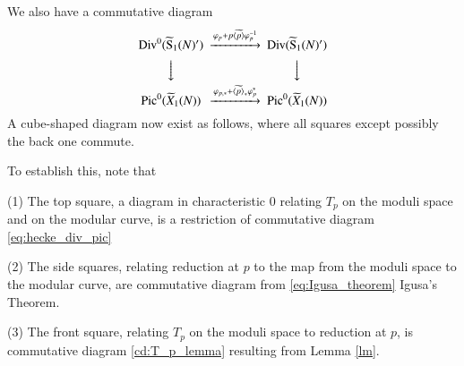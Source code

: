 We also have a commutative diagram 
\begin{equation}
    \begin{CD}
        {\rm Div}^0(\widetilde{{\rm S}}_1(N)') @>\varphi_p+p\widetilde{\left\langle p \right\rangle }\varphi_p^{-1}>> {\rm Div}(\widetilde{{\rm S}}_1(N)') \\
        @VVV @VVV \\
        {\rm Pic}^0(\widetilde{X}_1(N)) @>\varphi_{p,*}+\widetilde{\left\langle p \right\rangle }_*\varphi_p^*>> {\rm Pic}^0(\widetilde{X}_1(N))
    \end{CD}
    \label{cd:lemma}
\end{equation}
A cube-shaped diagram now exist as follows, where all squares except possibly the back one commute.

\begin{center}
\end{center}
To establish this, note that \par
(1) The top square, a diagram in characteristic 0 relating $T_p$ on the moduli space and on the modular curve, is a 
restriction of commutative diagram \ref{eq:hecke_div_pic} \par
(2) The side squares, relating reduction at $p$ to the map from the moduli space to the modular curve, are commutative diagram
from \ref{eq:Igusa_theorem} Igusa's Theorem.\par
(3) The front square, relating $T_p$ on the moduli space to reduction at $p$, is commutative diagram \ref{cd:T_p_lemma} resulting from
Lemma \ref{lm}. \par
